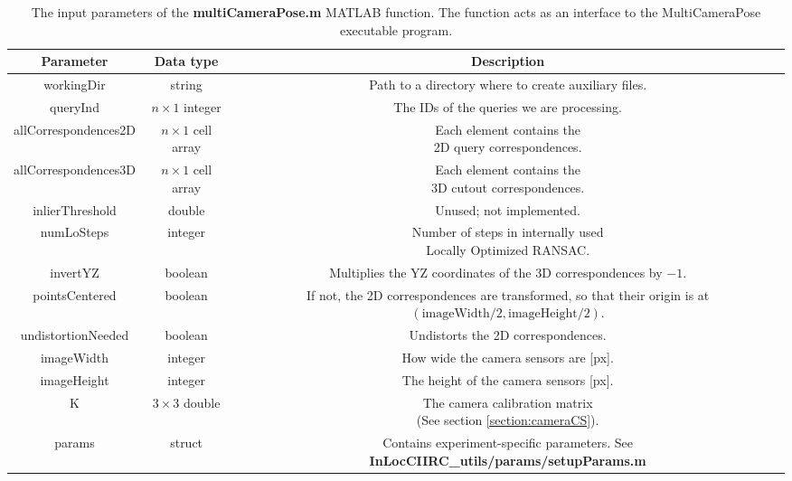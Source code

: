 \documentclass[twoside]{ctuthesis}
\theoremstyle{plain}
\theoremstyle{definition}
\theoremstyle{note}
\newcommand{\todo}[1][]{%
\ifthenelse{\isempty{#1}}{\textbf{TODO}}{\textbf{TODO: #1}}%
}
\begin{document}
\begin{table}[htb!]
	\centering
	\footnotesize
	\begin{tabular}{|c|c|c|}
		\hline
		Parameter & Data type & Description \\
		\hline
		\hline
		workingDir & string & Path to a directory where to create auxiliary files. \\
		\hline
		queryInd & $n \times 1$ integer & The IDs of the queries we are processing. \\
		\hline
		allCorrespondences2D & $n \times 1$ cell array & \makecell{Each element contains the \\ 2D query correspondences. \\ \todo[in what format?]} \\
		\hline
		allCorrespondences3D & $n \times 1$ cell array & \makecell{Each element contains the \\ 3D cutout correspondences. \\ \todo[in what format?]} \\
		\hline
		inlierThreshold & double & Unused; not implemented. \\
		\hline
		numLoSteps & integer & \makecell{Number of steps in internally used \\ Locally Optimized RANSAC.} \\
		\hline
		invertYZ & boolean & \makecell{Multiplies the YZ coordinates of the \\ 3D correspondences by $-1$.} \\
		\hline
		pointsCentered & boolean & \makecell{If not, the 2D correspondences are transformed, \\ so that their origin is \\ at $(\text{imageWidth}/2, \text{imageHeight}/2)$.} \\
		\hline
		undistortionNeeded & boolean & \makecell{Undistorts the 2D correspondences. \\ \todo[cite some distortion publication?]} \\
		\hline
		imageWidth & integer & How wide the camera sensors are [px]. \\
		\hline
		imageHeight & integer & The height of the camera sensors [px]. \\
		\hline
		K & $3 \times 3$ double & \makecell{The camera calibration matrix \\ (See section \ref{section:cameraCS})}. \\
		\hline
		params & struct & \makecell{Contains experiment-specific parameters. See \\ \textbf{InLocCIIRC\_utils/params/setupParams.m}} \\
		\hline
	\end{tabular}
	\caption{The input parameters of the \textbf{multiCameraPose.m} MATLAB function. The function acts as an interface to the MultiCameraPose executable program.}
	\label{tab:MCP_frontend_input}
\end{table}
\end{document}
